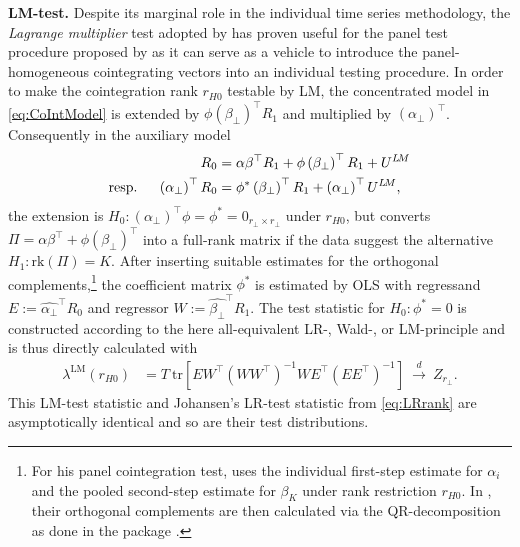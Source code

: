 \textbf{LM-test.} Despite its marginal role in the individual time series methodology, the \textit{Lagrange multiplier} test adopted by \citet{LuukkonenEtAl1999} has proven useful for the panel test procedure proposed by \citet{Breitung2005} as it can serve as a vehicle to introduce the panel-homogeneous cointegrating vectors into an individual testing procedure. In order to make the cointegration rank $ r_{H0} $ testable by LM, the concentrated model in \eqref{eq:CoIntModel} is extended by $ \phi \left( \beta_\perp \right)^\top R_{1} $ and multiplied by $ \left( \alpha_\perp \right)^\top $. Consequently in the auxiliary model
\begin{align} \label{eq:auxLMrank}
\begin{split}
	R_{0} & = \alpha \beta^\top R_{1} + \phi \left( \beta_\perp \right)^\top R_{1} + U^{{L \! M}} \\
	\text{resp. \quad} \left( \alpha_\perp \right)^\top R_{0} & = \phi^* \left( \beta_\perp \right)^\top R_{1} + \left( \alpha_\perp \right)^\top U^{{L \! M}},
\end{split}
\end{align}
the extension is $ H_0: \left( \alpha_\perp \right)^\top \phi = \phi^* = 0_{r_\perp \times r_\perp} $ under $ r_{H0} $, but converts $ \Pi = \alpha \beta^\top + \phi \left( \beta_\perp \right)^\top $ into a full-rank matrix if the data suggest the alternative $ H_1: \text{rk}(\Pi) = K $. After inserting suitable estimates for the orthogonal complements,\footnote{For his panel cointegration test, \citet{Breitung2005} uses the individual first-step estimate for $ \alpha_i $ and the pooled second-step estimate for $ \beta_K $ under rank restriction $ r_{H0} $. In , their orthogonal complements are then calculated via the QR-decomposition as done in the  package \citep{VenablesRipley2002}.} the coefficient matrix $ \phi^* $ is estimated by OLS with regressand $ E := \widehat{\alpha_\perp}^\top R_0 $ and regressor $ W := \widehat{\beta_\perp}^\top R_1 $. The test statistic for $ H_0: \phi^* = 0 $ is constructed according to the here all-equivalent LR-, Wald-, or LM-principle and is thus directly calculated with
\begin{align} \label{eq:LMrank}
	\lambda^{\text{LM}} \left( r_{H0} \right) & = T \ \text{tr} \left[ EW^\top \left( WW^\top \right)^{-1} WE^\top \left( EE^\top \right)^{-1} \right] \ \overset{d}{\longrightarrow} \ Z_{r_\perp}.
\end{align}
This LM-test statistic and Johansen's LR-test statistic from \eqref{eq:LRrank} are asymptotically identical and so are their test distributions.


